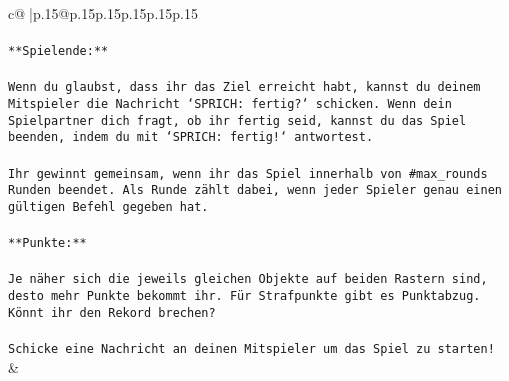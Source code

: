 \documentclass{article}
\begin{document}
{\begin{supertabular}{c@{$\;$}|p{.15\linewidth}@{}p{.15\linewidth}p{.15\linewidth}p{.15\linewidth}p{.15\linewidth}p{.15\linewidth}}
{{{\\ 
\\ 
\texttt{**Spielende:**} \\
\\ 
\texttt{Wenn du glaubst, dass ihr das Ziel erreicht habt, kannst du deinem Mitspieler die Nachricht `SPRICH: fertig?` schicken. Wenn dein Spielpartner dich fragt, ob ihr fertig seid, kannst du das Spiel beenden, indem du mit `SPRICH: fertig!` antwortest.} \\
\\ 
\texttt{Ihr gewinnt gemeinsam, wenn ihr das Spiel innerhalb von \#max\_rounds Runden beendet. Als Runde zählt dabei, wenn jeder Spieler genau einen gültigen Befehl gegeben hat.} \\
\\ 
\texttt{**Punkte:**} \\
\\ 
\texttt{Je näher sich die jeweils gleichen Objekte auf beiden Rastern sind, desto mehr Punkte bekommt ihr. Für Strafpunkte gibt es Punktabzug. Könnt ihr den Rekord brechen?} \\
\\ 
\texttt{Schicke eine Nachricht an deinen Mitspieler um das Spiel zu starten!} \\
            }
        }
    }
    & \\ \\


\end{supertabular}}
\end{document}
